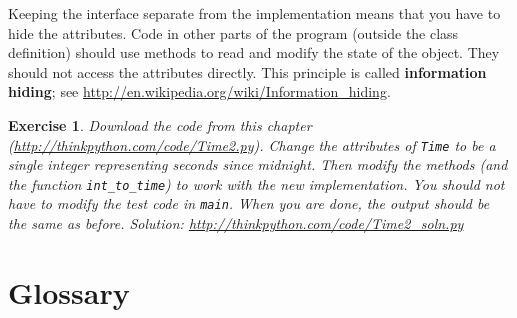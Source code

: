 \documentclass[12pt,a4paper,final,twoside,onecolumn,titlepage]{book}
\newtheorem{exercise}{Exercise}[chapter]
\begin{document}
Keeping the interface separate from the implementation means that
you have to hide the attributes.  Code in other parts of the program
(outside the class definition) should use methods to read
and modify the state of the object.  They should not access the
attributes directly.  This principle is called {\bf information hiding};
see \url{http://en.wikipedia.org/wiki/Information_hiding}.

\begin{exercise}

Download the code from this chapter
(\url{http://thinkpython.com/code/Time2.py}).  Change the attributes
of {\tt Time} to be a single integer representing seconds since
midnight.  Then modify the methods (and the function
\verb"int_to_time") to work with the new implementation.  You should
not have to modify the test code in {\tt main}.  When you are done,
the output should be the same as before.  Solution:
\url{http://thinkpython.com/code/Time2_soln.py}

\end{exercise}


\section{Glossary}
\end{document}
